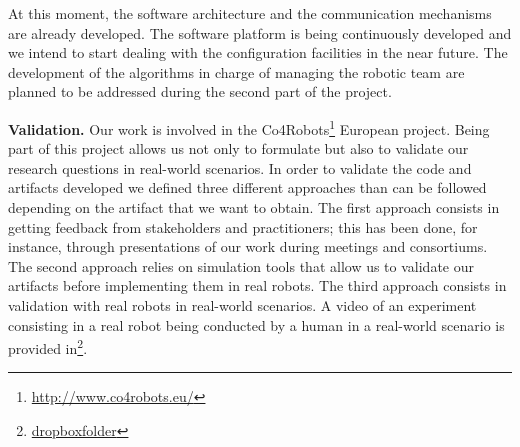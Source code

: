 At this moment, the software architecture and the communication mechanisms are already developed.
The software platform is being continuously developed and we intend to start dealing with the configuration facilities in the near future.
The development of the algorithms in charge of managing the robotic team are planned to be addressed during the second part of the project.

\noindent \textbf{Validation.} 
Our work is involved in the Co4Robots\footnote{\url{http://www.co4robots.eu/}} European project.
Being part of this project allows us not only to formulate but also to validate our research questions in real-world scenarios.
In order to validate the code and artifacts developed we defined three different approaches than can be followed depending on the artifact that we want to obtain.
The first approach consists in getting feedback from stakeholders and practitioners; this has been done, for instance, through presentations of our work during meetings and consortiums.
The second approach relies on simulation tools that allow us to validate our artifacts before implementing them in real robots.
The third approach consists in validation with real robots in real-world scenarios.
A video of an experiment consisting in a real robot being conducted by a human in a real-world scenario is provided in\footnote{\url{dropboxfolder}}.

